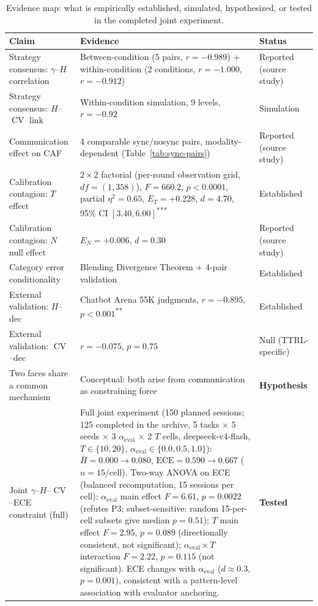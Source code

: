 \documentclass[11pt]{article}
\DeclareMathOperator{\CV}{CV}
\begin{document}
\begin{table}[t]
\centering
\caption{Evidence map: what is empirically established, simulated, hypothesized, or tested in the completed joint experiment.}
\label{tab:evidence}
\footnotesize
\begin{tabularx}{\textwidth}{@{}p{}X p{}@{}}
\toprule
\textbf{Claim} & \textbf{Evidence} & \textbf{Status} \\
\midrule
Strategy consensus: $\gamma$--$H$ correlation & Between-condition (5 pairs, $r{=}-0.989$) + within-condition (2 conditions, $r{=}-1.000$, $r{=}-0.912$)~\cite{impossible2026} & Reported (source study) \\
Strategy consensus: $H$--$\CV$ link & Within-condition simulation, 9 levels, $r{=}-0.92$~\cite{impossible2026} & Simulation \\
Communication effect on CAF & 4 comparable sync/nosync pairs, modality-dependent (Table~\ref{tab:sync-pairs}) & Reported (source study) \\
Calibration contagion: $T$ effect & $2{\times}2$ factorial (per-round observation grid, $df{=}(1,358)$), $F{=}660.2$, $p{<}0.0001$, partial $\eta^2{=}0.65$, $E_T{=}+0.228$, $d{=}4.70$, 95\% CI $[3.40, 6.00]$\textsuperscript{***}~\cite{calibration2026} & Established \\
Calibration contagion: $N$ null effect & $E_N{=}+0.006$, $d{=}0.30$~\cite{calibration2026} & Reported (source study) \\
Category error conditionality & Blending Divergence Theorem + 4-pair validation~\cite{foerster2016learning,kapetanakis2014balanced} & Established \\
External validation: $H$--dec & Chatbot Arena 55K judgments, $r{=}-0.895$, $p{<}0.001$\textsuperscript{**}~\cite{zheng2023chatbot,chiang2024chatbot} & Established \\
External validation: $\CV$--dec & $r{=}-0.075$, $p{=}0.75$~\cite{zheng2023chatbot,chiang2024chatbot} & Null (TTRL-specific) \\
\midrule
Two faces share a common mechanism & Conceptual: both arise from communication as constraining force & \textbf{Hypothesis} \\
Joint $\gamma$--$H$--$\CV$--ECE constraint (full) & Full joint experiment (150 planned sessions; 125 completed in the archive, 5 tasks $\times$ 5 seeds $\times$ 3 $\alpha_{\text{eval}}$ $\times$ 2 $T$ cells, deepseek-v4-flash, $T \in \{10,20\}$, $\alpha_{\text{eval}} \in \{0.0,0.5,1.0\}$): $\bar{H} = 0.000 \to 0.080$, $\overline{\text{ECE}} = 0.590 \to 0.667$ ($n = 15$/cell). Two-way ANOVA on ECE (balanced recomputation, 15 sessions per cell): $\alpha_{\text{eval}}$ main effect $F = 6.61$, $p = 0.0022$ (refutes P3; subset-sensitive: random 15-per-cell subsets give median $p=0.51$); $T$ main effect $F = 2.95$, $p = 0.089$ (directionally consistent, not significant); $\alpha_{\text{eval}} \times T$ interaction $F = 2.22$, $p = 0.115$ (not significant). ECE changes with $\alpha_{\text{eval}}$ ($d \approx 0.3$, $p = 0.001$), consistent with a pattern-level association with evaluator anchoring. & \textbf{Tested} \\ 

\end{tabularx}
\end{table}
\end{document}
